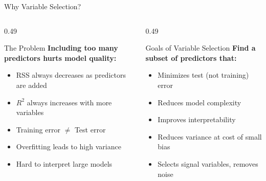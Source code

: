 \documentclass[ignorenonframetext,]{beamer}
\begin{document}
\begin{frame}{Why Variable Selection?}
\begin{columns}[T]
\begin{column}{0.49\textwidth}
\begin{alertblock}{The Problem}
\small
\textbf{Including too many predictors hurts model quality:}
\begin{itemize}
	\item RSS always decreases as predictors are added
	\item $R^2$ always increases with more variables
	\item Training error $\neq$ Test error
	\item Overfitting leads to high variance
	\item Hard to interpret large models
\end{itemize}
\end{alertblock}
\end{column}
\begin{column}{0.49\textwidth}
\begin{exampleblock}{Goals of Variable Selection}
\small
\textbf{Find a subset of predictors that:}
\begin{itemize}
	\item Minimizes test (not training) error
	\item Reduces model complexity
	\item Improves interpretability
	\item Reduces variance at cost of small bias
	\item Selects signal variables, removes noise
\end{itemize}
\end{exampleblock}
\end{column}
\end{columns}
\end{frame}
\end{document}
